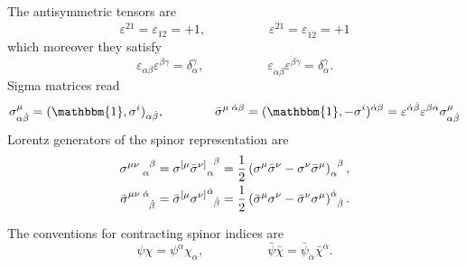 The antisymmetric tensors are
\[ \varepsilon^{21} = \varepsilon_{12} = +1 ,
\hspace{5em}
\varepsilon^{\dot 2 \dot 1} = \varepsilon_{\dot 1 \dot 2} = +1
\]
which moreover they satisfy
\[
\varepsilon_{\alpha\beta} \varepsilon^{\beta\gamma} = \delta^\gamma_\alpha,
\hspace{5em}
\varepsilon_{\dot\alpha\dot\beta} \varepsilon^{\dot\beta\dot\gamma} = \delta^\gamma_\alpha
.
\]
Sigma matrices read
\begin{equation}\label{notation-sigma-matrices}
	\sigma^\mu_{\alpha \dot\beta}
		=
	( \mathbbm{1} , \sigma^i )_{\alpha \dot \beta},
\hspace{4em}
	\bar\sigma^{\mu\; \dot \alpha \beta}
		=
	( \mathbbm{1} ,  -\sigma^i )^{\dot \alpha \beta}
		=
	\varepsilon^{\dot \alpha \dot \beta}
	\varepsilon^{\beta \alpha}
	\sigma^\mu_{\alpha \dot \beta}
\end{equation}
Lorentz generators of the spinor representation are
\begin{equation}\label{notation-gener-lorentz-spinor}
\begin{split}
	{\sigma^{\mu \nu \; }}\indices{ _{ \alpha} ^{{\beta}} }
& =
	 {\sigma^{[\mu}\bar\sigma^{\nu]}}%
		\indices{ _\alpha ^\beta }
=
	\frac{1}{2} \left(
				\sigma^\mu \bar \sigma^\nu
				-
				\sigma^\nu \bar \sigma^\mu 
			\right)\indices{ _\alpha ^\beta },
\\
	{{\bar{\sigma}}}\indices{ ^{\mu \nu \; } ^{\dot \alpha} _{\dot{\beta}} }
& =
	 {\bar\sigma^{[\mu}\sigma^{\nu]}}
		\indices{ ^{\dot{\alpha}} _{\dot{\beta}}}
=
	\frac{1}{2} \left(
				\bar \sigma^\mu \sigma^\nu
				-
				\bar \sigma^\nu \sigma^\mu 
			\right)\indices{ ^{\dot{\alpha}} _{\dot{\beta}}}.
\end{split}
\end{equation}


The conventions for contracting spinor indices are
\begin{equation}
\psi \chi = \psi^\alpha \chi_\alpha,
\hspace{5em}
\bar \psi \bar \chi = \bar \psi_{\dot \alpha} \bar \chi^{\dot \alpha}.
\end{equation}


